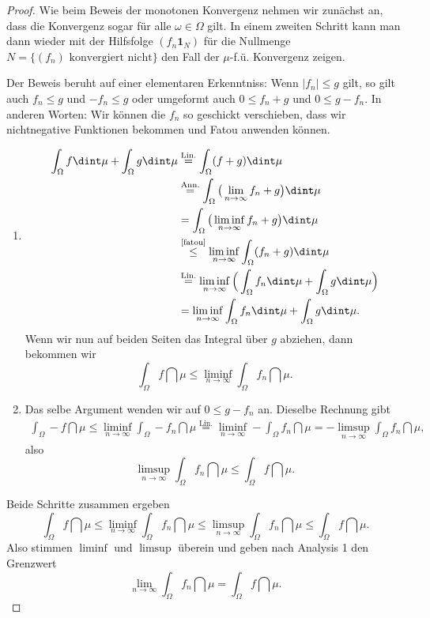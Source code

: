 \begin{proof}
	Wie beim Beweis der monotonen Konvergenz nehmen wir zun\"achst an, dass die Konvergenz sogar für alle $\omega \in \Omega$ gilt. In einem zweiten Schritt kann man dann wieder mit der Hilfsfolge $(f_n \mathbf{1}_N)$ f\"ur die Nullmenge $N=\{(f_n)\text{ konvergiert nicht}\}$ den Fall der $\mu$-f.\"u. Konvergenz zeigen.\smallskip
	
	Der Beweis beruht auf einer elementaren Erkenntniss: Wenn $|f_n| \leq g$ gilt, so gilt auch $f_n \leq g$ und $-f_n \leq g$ oder umgeformt auch $0 \leq f_n + g$ und $0 \leq g - f_n$. In anderen Worten: Wir k\"onnen die $f_n$ so geschickt verschieben, dass wir nichtnegative Funktionen bekommen und Fatou anwenden k\"onnen.
	
	\begin{enumerate}[label=(\roman*)]
		\item 
		\begin{align*}
			\int_{\Omega} f \dint \mu + \int_{\Omega} g \dint \mu &\overset{\text{Lin.}}{=} \int_{\Omega} (f+g) \dint \mu\\
			& \overset{\text{Ann.}}{=} \int_{\Omega} \big(\lim\limits_{n \to \infty} f_n + g\big) \dint \mu\\ 
			&= \int_{\Omega} \big(\liminf\limits_{n \to \infty} f_n+g\big) \dint \mu\\
			& \overset{\text{\ref{fatou}}}{\leq} \liminf\limits_{n \to \infty} \int_{\Omega} (f_n+g) \dint \mu\\
			& \overset{\text{Lin.}}{=} \liminf\limits_{n \to \infty} \Big(\int_{\Omega} f_n \dint \mu + \int_{\Omega} g \dint \mu \Big)\\ 
			&= \liminf\limits_{n \to \infty} \int_{\Omega} f_n \dint \mu  + \int_{\Omega} g \dint \mu.
		\end{align*}
		Wenn wir nun auf beiden Seiten das Integral \"uber $g$ abziehen, dann bekommen wir
		 \[ \int_{\Omega} f \dint \mu \leq \liminf\limits_{n \to \infty} \int_{\Omega} f_n \dint \mu. \]
		\item Das selbe Argument wenden wir auf $0 \leq g - f_n$ an. Dieselbe Rechnung gibt
		\begin{gather*}
			 \int_{\Omega} -f \dint \mu \leq \liminf\limits_{n \to \infty} \int_{\Omega} -f_n \dint \mu
			\overset{\text{Lin.}}{=} \liminf\limits_{n \to \infty} -\int_{\Omega} f_n \dint \mu = - \limsup\limits_{n \to \infty} \int_{\Omega} f_n \dint \mu,
		\end{gather*}
		also \[ \limsup\limits_{n \to \infty} \int_{\Omega} f_n \dint \mu \leq \int_{\Omega} f \dint \mu. \]
	\end{enumerate}
		Beide Schritte zusammen ergeben \[ \int_{\Omega} f \dint \mu \leq \liminf\limits_{n \to \infty} \int_{\Omega} f_n \dint \mu \leq \limsup\limits_{n \to \infty} \int_{\Omega} f_n \dint \mu \leq \int_{\Omega} f \dint \mu. \]
		Also stimmen $\liminf$ und $\limsup$ \"uberein und geben nach Analysis 1 den Grenzwert		
		\[  \lim\limits_{n \to \infty} \int_{\Omega} f_n \dint \mu=\int_{\Omega} f \dint \mu . \]
\end{proof}
